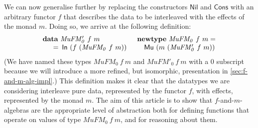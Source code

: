 \documentclass{jfp1}
\newcommand{\kw}[1]{\textbf{#1}}
\begin{document}
We can now generalise further by replacing the constructors
$\mathsf{Nil}$ and $\mathsf{Cons}$ with an arbitrary functor $f$ that
describes the data to be interleaved with the effects of the monad
$m$. Doing so, we arrive at the following definition:
\begin{displaymath}
  \begin{array}{ll}
    \kw{data}~\mathit{MuFM_0'}~f~m
    &
    \kw{newtype}~\mathit{MuFM_0}~f~m =
    \\
    \quad
    \begin{array}[t]{c@{\hspace{0.5em}}l}
      = & \mathsf{In}~(f~(\mathit{MuFM_0}~f~m))
    \end{array}
    &
    \quad \mathsf{Mu}~(m~(\mathit{MuFM_0'}~f~m))
  \end{array}
\end{displaymath}
(We have named these types $\mathit{MuFM_0}~f~m$ and
$\mathit{MuFM'_0}~f~m$ with a $0$ subscript because we will introduce
a more refined, but isomorphic, presentation in
\autoref{sec:f-and-m-alg-impl}.) This definition makes it clear that
the datatypes we are considering interleave pure data, represented by
the functor $f$, with effects, represented by the monad $m$. The aim
of this article is to show that $f$-and-$m$-algebras are the
appropriate level of abstraction both for defining functions that
operate on values of type $\mathit{MuFM_0}~f~m$, and for reasoning
about them.


\end{document}
